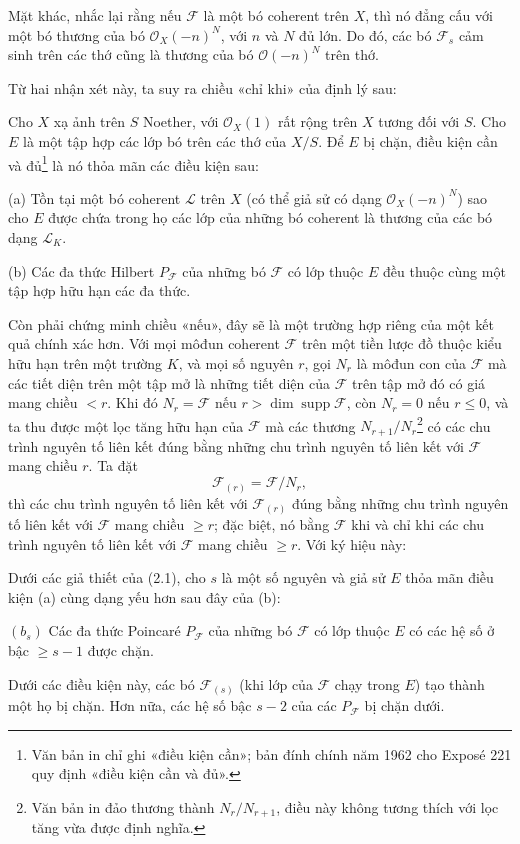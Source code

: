 Mặt khác, nhắc lại rằng nếu $\mathcal F$ là một bó coherent trên $X$, thì nó
đẳng cấu với một bó thương của bó $\mathcal O_X(-n)^N$, với $n$ và $N$ đủ
lớn. Do đó, các bó $\mathcal F_s$ cảm sinh trên các thớ cũng là thương của bó
$\mathcal O(-n)^N$ trên thớ.

Từ hai nhận xét này, ta suy ra chiều «chỉ khi» của định lý sau:

 Cho $X$ xạ ảnh trên $S$ Noether, với
$\mathcal O_X(1)$ rất rộng trên $X$ tương đối với $S$. Cho $E$ là một tập hợp
các lớp bó trên các thớ của $X/S$. Để $E$ bị chặn, điều kiện cần và đủ\footnote{Văn
bản in chỉ ghi «điều kiện cần»; bản đính chính năm 1962 cho Exposé 221 quy định
«điều kiện cần và đủ».} là nó thỏa mãn các điều kiện sau:

\medskip
\noindent (a) Tồn tại một bó coherent $\mathcal L$ trên $X$ (có thể giả sử có
dạng $\mathcal O_X(-n)^N$) sao cho $E$ được chứa trong họ các lớp của những bó
coherent là thương của các bó dạng $\mathcal L_K$.

\smallskip
\noindent (b) Các đa thức Hilbert $P_{\mathcal F}$ của những bó $\mathcal F$
có lớp thuộc $E$ đều thuộc cùng một tập hợp hữu hạn các đa thức.

Còn phải chứng minh chiều «nếu», đây sẽ là một trường hợp riêng của một kết quả
chính xác hơn. Với mọi môđun coherent $\mathcal F$ trên một tiền lược đồ thuộc
kiểu hữu hạn trên một trường $K$, và mọi số nguyên $r$, gọi $N_r$ là môđun con
của $\mathcal F$ mà các tiết diện trên một tập mở là những tiết diện của
$\mathcal F$ trên tập mở đó có giá mang chiều $<r$. Khi đó
$N_r=\mathcal F$ nếu $r>\dim\operatorname{supp}\mathcal F$, còn $N_r=0$ nếu
$r\leq0$, và ta thu được một lọc tăng hữu hạn của $\mathcal F$ mà các thương
$N_{r+1}/N_r$\footnote{Văn bản in đảo thương thành $N_r/N_{r+1}$, điều này
không tương thích với lọc tăng vừa được định nghĩa.} có các chu trình nguyên tố
liên kết đúng bằng những chu trình nguyên tố liên kết với $\mathcal F$ mang
chiều $r$. Ta đặt
\[
\mathcal F_{(r)}=\mathcal F/N_r,
\]
thì các chu trình nguyên tố liên kết với $\mathcal F_{(r)}$ đúng bằng những chu
trình nguyên tố liên kết với $\mathcal F$ mang chiều $\geq r$; đặc biệt, nó
bằng $\mathcal F$ khi và chỉ khi các chu trình nguyên tố liên kết với
$\mathcal F$ mang chiều $\geq r$. Với ký hiệu này:

 Dưới các giả thiết của (2.1), cho $s$ là một số nguyên
và giả sử $E$ thỏa mãn điều kiện (a) cùng dạng yếu hơn sau đây của (b):

\medskip
\noindent $(b_s)$ Các đa thức Poincaré $P_{\mathcal F}$ của những bó
$\mathcal F$ có lớp thuộc $E$ có các hệ số ở bậc $\geq s-1$ được chặn.

Dưới các điều kiện này, các bó $\mathcal F_{(s)}$ (khi lớp của $\mathcal F$
chạy trong $E$) tạo thành một họ bị chặn. Hơn nữa, các hệ số bậc $s-2$ của
các $P_{\mathcal F}$ bị chặn dưới.
